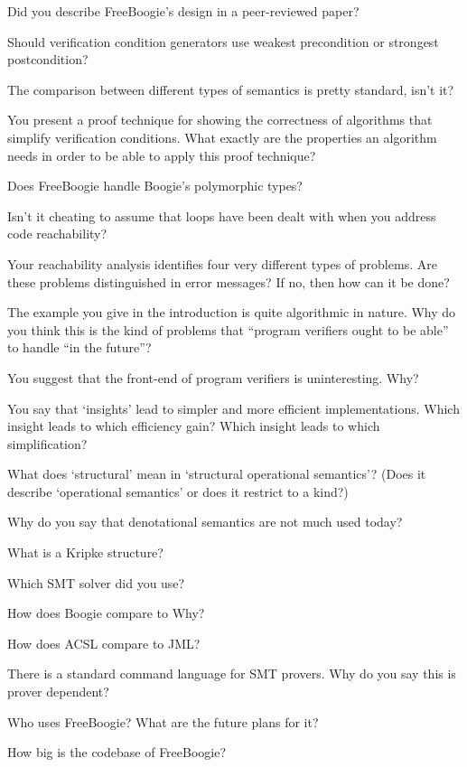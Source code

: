 \Q Did you describe FreeBoogie's design in a peer-reviewed paper?

\Q Should verification condition generators use weakest precondition or
strongest postcondition?


\Q The comparison between different types of semantics is pretty standard,
isn't it?

\Q You present a proof technique for showing the correctness of algorithms
that simplify verification conditions. What exactly are the properties an
algorithm needs in order to be able to apply this proof technique?

\Q Does FreeBoogie handle Boogie's polymorphic types?

\Q Isn't it cheating to assume that loops have been dealt with when you
address code reachability?

\Q Your reachability analysis identifies four very different types of
problems.  Are these problems distinguished in error messages? If no, then
how can it be done?

\Q The example you give in the introduction is quite algorithmic in nature.
Why do you think this is the kind of problems that ``program verifiers
ought to be able'' to handle ``in the future''?

\Q You suggest that the front-end of program verifiers is uninteresting.
Why?

\Q You say that `insights' lead to simpler and more efficient
implementations.  Which insight leads to which efficiency gain? Which
insight leads to which simplification?

\Q What does `structural' mean in `structural operational semantics'?
(Does it describe `operational semantics' or does it restrict to a kind?)

\Q Why do you say that denotational semantics are not much used today?

\Q What is a Kripke structure?

\Q Which SMT solver did you use?

\Q How does Boogie compare to Why?

\Q How does ACSL compare to JML?

\Q There is a standard command language for SMT provers. Why do you say
this is prover dependent?

\Q Who uses FreeBoogie? What are the future plans for it?

\Q How big is the codebase of FreeBoogie?

